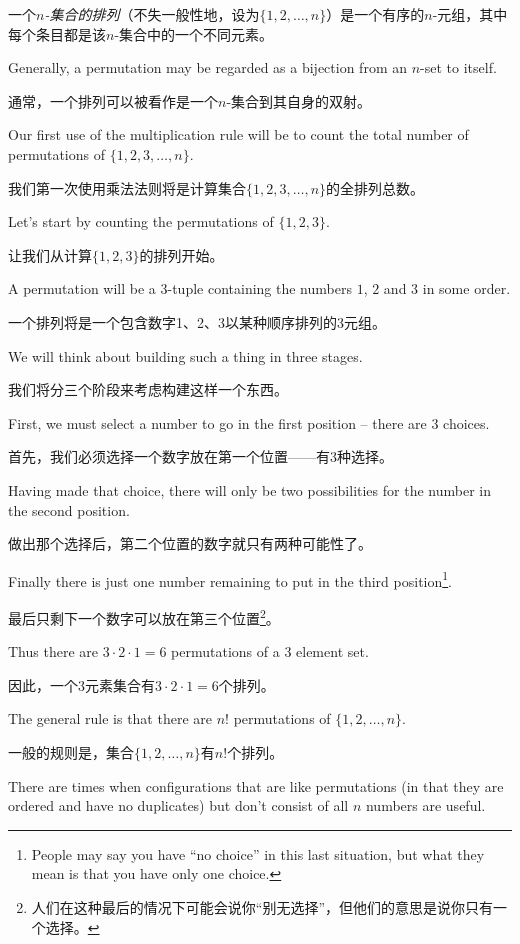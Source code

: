 一个\emph{$n$-集合的排列}（不失一般性地，设为$\{1,2,\ldots , n\}$）是一个有序的$n$-元组，其中每个条目都是该$n$-集合中的一个不同元素。

Generally, a permutation may be regarded as a bijection from
an $n$-set to itself.

通常，一个排列可以被看作是一个$n$-集合到其自身的双射。

Our first use of the multiplication rule will
be to count the total number of permutations of $\{1, 2, 3, \ldots ,n\}$.

我们第一次使用乘法法则将是计算集合$\{1, 2, 3, \ldots ,n\}$的全排列总数。

Let's start by counting the permutations of   $\{1, 2, 3\}$.

让我们从计算$\{1, 2, 3\}$的排列开始。

A permutation will be a 3-tuple containing the numbers $1$, $2$ and
$3$ in some order.

一个排列将是一个包含数字1、2、3以某种顺序排列的3元组。

We will think about building such a thing in 
three stages.

我们将分三个阶段来考虑构建这样一个东西。

First,
we must select a number to go in the first position -- there are $3$ choices.

首先，我们必须选择一个数字放在第一个位置——有3种选择。

Having made that choice, there will only be two possibilities for the number
in the second position.

做出那个选择后，第二个位置的数字就只有两种可能性了。

Finally there is just one number remaining to put in
the third position\footnote{People may say you have ``no choice'' in this %
last situation, but what they mean is that you have only one choice.}.

最后只剩下一个数字可以放在第三个位置\footnote{人们在这种最后的情况下可能会说你“别无选择”，但他们的意思是说你只有一个选择。}。

Thus there are $3\cdot 2\cdot 1 = 6$ permutations of a $3$ element set.

因此，一个3元素集合有$3\cdot 2\cdot 1 = 6$个排列。

The general rule is that there are $n!$ permutations of $\{1, 2, \ldots , n\}$.

一般的规则是，集合$\{1, 2, \ldots , n\}$有$n!$个排列。

There are times when configurations that are like permutations (in that they
are ordered and have no duplicates) but don't consist of all $n$ numbers 
are useful.

